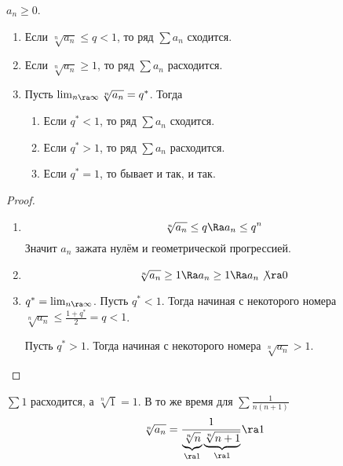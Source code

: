 \begin{theorem}
	$a_n \ge 0$.
	\begin{enumerate}
	\item
		Если $\sqrt[n]{a_n} \le q < 1$, то ряд $\sum a_n$ сходится.

	\item
		Если $\sqrt[n]{a_n} \ge 1$, то ряд $\sum a_n$ расходится.

	\item
		Пусть $\lim_{n\ra\infty} \sqrt[n]{a_n} = q^*$.
		Тогда
		\begin{enumerate}
			\item Если $q^* < 1$, то ряд $\sum a_n$ сходится.
			\item Если $q^* > 1$, то ряд $\sum a_n$ расходится.
			\item Если $q^* = 1$, то бывает и так, и так.
		\end{enumerate}
	\end{enumerate}
\end{theorem}
\begin{proof}
	\begin{enumerate}
	\item
		\[ \sqrt[n]{a_n} \le q \Ra a_n \le q^n \]
		Значит $a_n$ зажата нулём и геометрической прогрессией.

	\item
		\[ \sqrt[n]{a_n} \ge 1 \Ra a_n \ge 1 \Ra a_n \not\ra 0 \]

	\item
		$q^* = \lim_{n\ra\infty}$.
		Пусть $q^* < 1$.
		Тогда начиная с некоторого номера $\sqrt[n]{a_n} \le \frac{1+q^*}2 = q < 1$.

		Пусть $q^* > 1$.
		Тогда начиная с некоторого номера $\sqrt[n]{a_n} > 1$.
	\end{enumerate}
\end{proof}

\begin{exmp}
	$\sum 1$ расходится, а $\sqrt[n]{1} = 1$.
	В то же время для $\sum \frac1{n(n+1)}$
	\[ \sqrt[n]{a_n} = \frac1{\underbrace{\sqrt[n]{n}}_{\ra 1}\underbrace{\sqrt[n]{n+1}}_{\ra 1}} \ra 1\]
\end{exmp}

